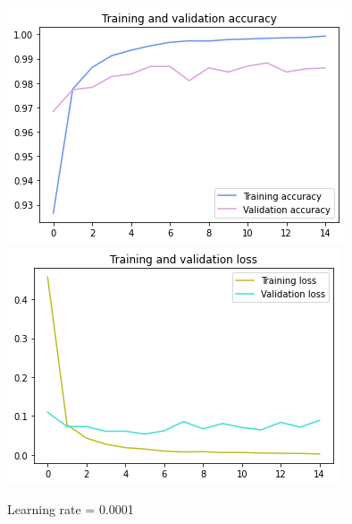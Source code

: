 \documentclass[12pt,a4paper]{scrartcl}		%
\begin{document}
        \begin{figure}[h]
            \centering
            \includegraphics[scale = 0.5]{acc0001.png}
            \includegraphics[scale = 0.5]{loss0001.png}
            \caption{Learning rate = 0.0001}
            \label{fig::cnn0001}
        \end{figure} 
\end{document}
